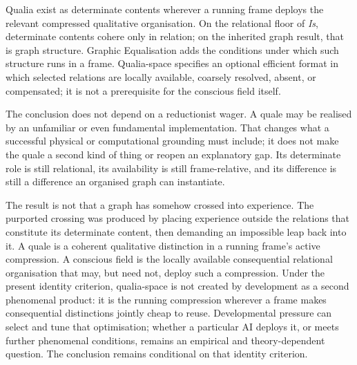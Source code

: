 \documentclass[11pt,a4paper]{article}
\theoremstyle{remark}\newtheorem{remark}[definition]{Remark}
\begin{document}
Qualia exist as determinate contents wherever a running frame deploys the relevant
compressed qualitative organisation. On the relational floor of \emph{Is},
determinate contents cohere only in relation; on the inherited graph result, that
is graph structure. Graphic Equalisation adds the conditions under which such
structure runs in a frame. Qualia-space specifies an optional efficient format in
which selected relations are locally available, coarsely resolved, absent, or
compensated; it is not a prerequisite for the conscious field itself.

The conclusion does not depend on a reductionist wager. A quale may be realised by
an unfamiliar or even fundamental implementation. That changes what a successful
physical or computational grounding must include; it does not make the quale a
second kind of thing or reopen an explanatory gap. Its determinate role is still
relational, its availability is still frame-relative, and its difference is still
a difference an organised graph can instantiate.

The result is not that a graph has somehow crossed into experience. The purported
crossing was produced by placing experience outside the relations that constitute
its determinate content, then demanding an impossible leap back into it. A quale is
a coherent qualitative distinction in a running frame's active compression. A
conscious field is the locally available consequential relational organisation that
may, but need not, deploy such a compression. Under the present identity
criterion, qualia-space is not created by development as a second phenomenal
product: it is the running compression wherever a frame makes consequential
distinctions jointly cheap to reuse. Developmental pressure can select and tune
that optimisation; whether a particular AI deploys it, or meets further phenomenal
conditions, remains an empirical and theory-dependent question. The conclusion remains conditional on that identity criterion.
\end{document}
